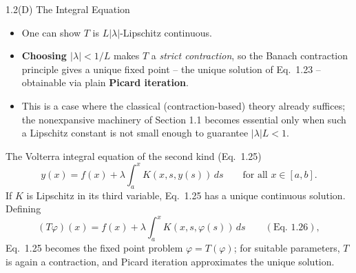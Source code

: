 \documentclass[aspectratio=169,10pt]{beamer}
\begin{document}
\begin{frame}[allowframebreaks]{1.2(D) The Integral Equation}
\framebreak

\begin{itemize}
  \item One can show $T$ is $L|\lambda|$-Lipschitz continuous.
  \item \textbf{Choosing $|\lambda|<1/L$} makes $T$ a \emph{strict
    contraction}, so the Banach contraction principle gives a unique
    fixed point -- the unique solution of Eq.\ 1.23 -- obtainable via
    plain \textbf{Picard iteration}.
  \item This is a case where the classical (contraction-based) theory
    already suffices; the nonexpansive machinery of Section 1.1 becomes
    essential only when such a Lipschitz constant is not small enough to
    guarantee $|\lambda|L<1$.
\end{itemize}

\framebreak

\begin{block}{The Volterra integral equation of the second kind (Eq.\ 1.25)}
\[
  y(x) = f(x) + \lambda\int_a^x K(x,s,y(s))\,ds \qquad \text{for all } x\in[a,b].
\]
If $K$ is Lipschitz in its third variable, Eq.\ 1.25 has a unique
continuous solution. Defining
\[
  (T\varphi)(x) = f(x)+\lambda\int_a^x K(x,s,\varphi(s))\,ds \qquad (\text{Eq. } 1.26),
\]
Eq.\ 1.25 becomes the fixed point problem $\varphi=T(\varphi)$; for
suitable parameters, $T$ is again a contraction, and Picard iteration
approximates the unique solution.
\end{block}

\end{frame}
\end{document}
